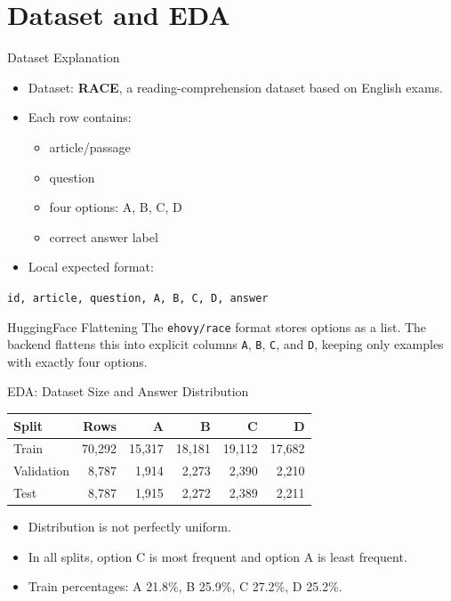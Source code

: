 \documentclass[aspectratio=169,11pt]{beamer}
\begin{document}
\section{Dataset and EDA}

\begin{frame}{Dataset Explanation}
    \begin{itemize}
        \item Dataset: \textbf{RACE}, a reading-comprehension dataset based on English exams.
        \item Each row contains:
        \begin{itemize}
            \item article/passage
            \item question
            \item four options: A, B, C, D
            \item correct answer label
        \end{itemize}
        \item Local expected format:
    \end{itemize}

    \begin{center}
        \texttt{id, article, question, A, B, C, D, answer}
    \end{center}

    \begin{block}{HuggingFace Flattening}
        The \texttt{ehovy/race} format stores options as a list. The backend flattens
        this into explicit columns \texttt{A}, \texttt{B}, \texttt{C}, and \texttt{D},
        keeping only examples with exactly four options.
    \end{block}
\end{frame}

\begin{frame}{EDA: Dataset Size and Answer Distribution}
    \begin{table}
        \centering
        \small
        \begin{tabular}{lrrrrr}
            \toprule
            \textbf{Split} & \textbf{Rows} & \textbf{A} & \textbf{B} & \textbf{C} & \textbf{D} \\
            \midrule
            Train & 70,292 & 15,317 & 18,181 & 19,112 & 17,682 \\
            Validation & 8,787 & 1,914 & 2,273 & 2,390 & 2,210 \\
            Test & 8,787 & 1,915 & 2,272 & 2,389 & 2,211 \\
            \bottomrule
        \end{tabular}
    \end{table}

    \vspace{0.2cm}
    \begin{itemize}
        \item Distribution is not perfectly uniform.
        \item In all splits, option C is most frequent and option A is least frequent.
        \item Train percentages: A 21.8\%, B 25.9\%, C 27.2\%, D 25.2\%.
    \end{itemize}
\end{frame}
\end{document}
